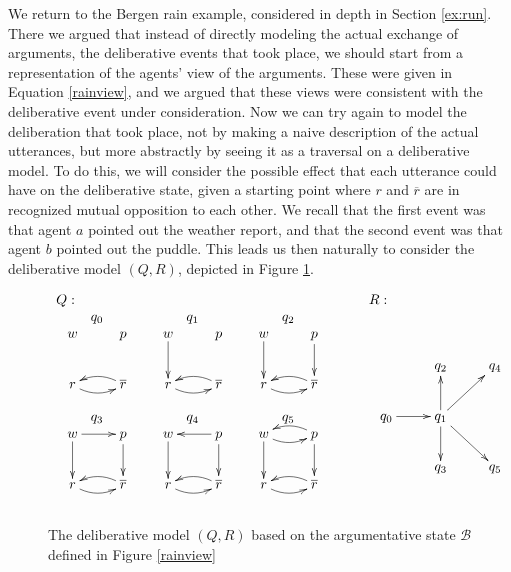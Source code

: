 \documentclass[greybox]{svmult}
\renewcommand{\bar}[1]{\overline{#1}}
\newcommand{\views}{\mathcal B}
\begin{document}
\begin{example}
We return to the Bergen rain example, considered in depth in Section \ref{ex:run}. There we argued that instead of directly modeling the actual exchange of arguments, the deliberative events that took place, we should start from a representation of the agents' view of the arguments. These were given in Equation \ref{rainview}, and we argued that these views were consistent with the deliberative event under consideration. Now we can try again to model the deliberation that took place, not by making a naive description of the actual utterances, but more abstractly by seeing it as a traversal on a deliberative model. To do this, we will consider the possible effect that each utterance could have on the deliberative state, given a starting point where $r$ and $\overline r$ are in recognized mutual opposition to each other. We recall that the first event was that agent $a$ pointed out the weather report, and that the second event was that agent $b$ pointed out the puddle. This leads us then naturally to consider the deliberative model $(Q,R)$, depicted in Figure \ref{rain}.
\begin{figure}\label{rain}
$\begin{array}{lll}
Q: & \hspace{0.3cm} & R: \\ 
\begin{array}{ccccccccc}
q_0 && q_1 && q_2 \\ 
\xymatrix{ w & p \\ r \ar@/_/[r] & \bar r \ar@/_/[l] } &&  \xymatrix{ w \ar[d] & p \\ r \ar@/_/[r] & \bar r \ar@/_/[l] } && \xymatrix{ w \ar[d] & p \ar[d] \\ r \ar@/_/[r] & \bar r \ar@/_/[l] } \\ \\
q_3 && q_4 && q_5 \\
\xymatrix{ w \ar[d] \ar[r] & p \ar[d] \\ r \ar@/_/[r] & \bar r \ar@/_/[l] } && \xymatrix{ w \ar[d] & p \ar[d] \ar[l] \\ r \ar@/_/[r] & \bar r \ar@/_/[l] } && \xymatrix{ w \ar@/_/[r] \ar[d]  & p \ar[d] \ar@/_/[l] \\ r \ar@/_/[r] & \bar r \ar@/_/[l] } \\ \\
\end{array} &\hspace{0.3cm} & 
\begin{array}{l} \\
\xymatrix{ & q_2 & q_4 \\
q_0 \ar[r] & q_1 \ar[ur] \ar[u] \ar[d] \ar[dr] \\ & q_3 & q_5 }
\end{array}
\end{array}$
\caption{The deliberative model $(Q,R)$ based on the argumentative state $\views$ defined in Figure \ref{rainview}}
\end{figure}


\end{example}
\end{document}
